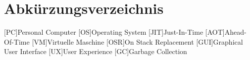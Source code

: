 \chapter*{Abkürzungsverzeichnis}
\begin{acronym}
    [PC]{Personal Computer}
    [OS]{Operating System}
    [JIT]{Just-In-Time}
    [AOT]{Ahead-Of-Time}
    [VM]{Virtuelle Maschine}
    [OSR]{On Stack Replacement}
    [GUI]{Graphical User Interface}
    [UX]{User Experience}
    [GC]{Garbage Collection}

\end{acronym}